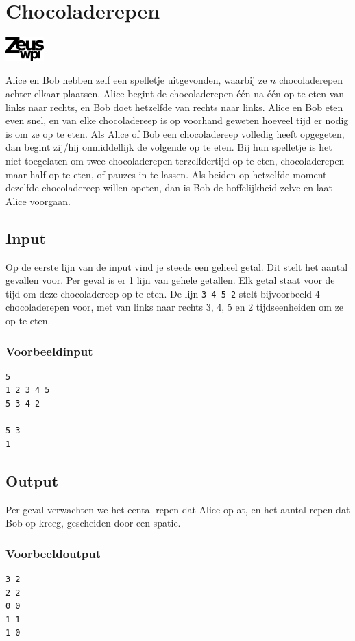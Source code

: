 
\section*{Chocoladerepen}
\flushright
\includegraphics[width=4em]{logo-new.png}
\flushleft

Alice en Bob hebben zelf een spelletje uitgevonden, waarbij ze $n$
chocoladerepen achter elkaar plaatsen. Alice begint de chocoladerepen \'e\'en
na \'e\'en op te eten van links naar rechts, en Bob doet hetzelfde van rechts
naar links. Alice en Bob eten even snel, en van elke chocoladereep is op
voorhand geweten hoeveel tijd er nodig is om ze op te eten. Als Alice of Bob
een chocoladereep volledig heeft opgegeten, dan begint zij/hij onmiddellijk de
volgende op te eten. Bij hun spelletje is het niet toegelaten om twee
chocoladerepen terzelfdertijd op te eten, chocoladerepen maar half op te eten,
of pauzes in te lassen. Als beiden op hetzelfde moment dezelfde chocoladereep
willen opeten, dan is Bob de hoffelijkheid zelve en laat Alice voorgaan.

\subsection*{Input}

Op de eerste lijn van de input vind je steeds een geheel getal. Dit stelt het
aantal gevallen voor. Per geval is er 1 lijn van gehele getallen. Elk getal
staat voor de tijd om deze chocoladereep op te eten. De lijn \texttt{3 4 5 2}
stelt bijvoorbeeld 4 chocoladerepen voor, met van links naar rechts 3, 4, 5 en 2
tijdseenheiden om ze op te eten.

\subsubsection*{Voorbeeldinput}

\begin{verbatim}
5
1 2 3 4 5
5 3 4 2

5 3
1
\end{verbatim}

\subsection*{Output}

Per geval verwachten we het eental repen dat Alice op at, en het aantal repen
dat Bob op kreeg, gescheiden door een spatie.

\subsubsection*{Voorbeeldoutput}

\begin{verbatim}
3 2
2 2
0 0
1 1
1 0
\end{verbatim}

